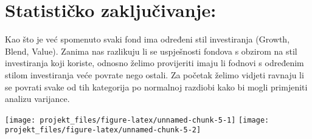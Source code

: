 \documentclass[
]{article}
\newenvironment{Shaded}{\begin{snugshade}}{\end{snugshade}}
\newcommand{\DataTypeTok}[1]{\textcolor[rgb]{0.13,0.29,0.53}{#1}}
\newcommand{\KeywordTok}[1]{\textcolor[rgb]{0.13,0.29,0.53}{\textbf{#1}}}
\newcommand{\NormalTok}[1]{#1}
\newcommand{\OperatorTok}[1]{\textcolor[rgb]{0.81,0.36,0.00}{\textbf{#1}}}
\newcommand{\StringTok}[1]{\textcolor[rgb]{0.31,0.60,0.02}{#1}}
\begin{document}
\hypertarget{statistiux10dko-zakljuux10divanje}{%
\section{Statističko
zaključivanje:}\label{statistiux10dko-zakljuux10divanje}}

Kao što je već spomenuto svaki fond ima određeni stil investiranja
(Growth, Blend, Value). Zanima nas razlikuju li se uspješnosti fondova s
obzirom na stil investiranja koji koriste, odnosno želimo provijeriti
imaju li fodnovi s određenim stilom investiranja veće povrate nego
ostali. Za početak želimo vidjeti ravnaju li se povrati svake od tih
kategorija po normalnoj razdiobi kako bi mogli primjeniti analizu
varijance.

\begin{Shaded}
\end{Shaded}

\texttt{[image: projekt\_files/figure-latex/unnamed-chunk-5-1]}
\texttt{[image: projekt\_files/figure-latex/unnamed-chunk-5-2]}

\begin{Shaded}
\end{Shaded}
\end{document}
